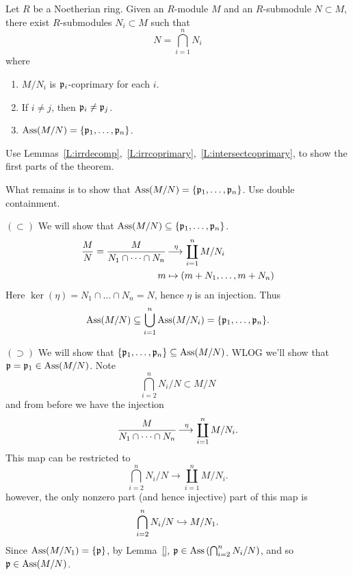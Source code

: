 \documentclass{ximera}
\begin{document}
\begin{theorem}
  Let $R$ be a Noetherian ring. Given an $R$-module $M$ and an
  $R$-submodule $N\subset M$, there exist $R$-submodules $N_i\subset
  M$ such that
  \[
  N = \bigcap_{i=1}^n N_i
  \]
  where
  \begin{enumerate}
  \item $M/N_i$ is $\mathfrak{p}_i$-coprimary for each $i$.
  \item If $i\ne j$, then $\mathfrak{p}_i\ne\mathfrak{p}_j$.
  \item $\operatorname{Ass}(M/N) = \{\mathfrak{p}_1,\dots,\mathfrak{p}_n\}$.
  \end{enumerate}
  \begin{sketch}
    Use Lemmas~\ref{L:irrdecomp},~\ref{L:irrcoprimary},~\ref{L:intersectcoprimary},
    to show the first parts of the theorem.
    
    What remains is to show that $\operatorname{Ass}(M/N) =
    \{\mathfrak{p}_1,\dots,\mathfrak{p}_n\}$. Use double containment.
    
    $(\subset)$ We will show that $\operatorname{Ass}(M/N)
    \subseteq\{\mathfrak{p}_1,\dots,\mathfrak{p}_n\}$.
    \begin{align*}
      \frac{M}{N} = \frac{M}{N_1\cap\dots\cap N_n} &\mathop{\longrightarrow\,}\limits^\eta \coprod_{i=1}^n M/N_i\\
        m &\mapsto (m + N_1,\dots, m+ N_n)
    \end{align*}
    Here $\ker(\eta) = N_1\cap\dots\cap N_n = N$, hence $\eta$ is an
    injection. Thus
    \[
    \operatorname{Ass}(M/N) \subseteq \bigcup_{i=1}^n \operatorname{Ass}(M/N_i) = \{\mathfrak{p}_1,\dots,\mathfrak{p}_n\}.
    \]


    $(\supset)$ We will show that $\{\mathfrak{p}_1,\dots,\mathfrak{p}_n\} \subseteq
    \operatorname{Ass}(M/N)$. WLOG we'll show that $\mathfrak{p}=\mathfrak{p}_1\in\operatorname{Ass}(M/N)$. Note
    \[
    \bigcap_{i=2}^n N_i/N \subset M/N
    \]
    and from before we have the injection
    \[
    \frac{M}{N_1\cap\dots\cap N_n} \mathop{\longrightarrow\,}\limits^\eta \coprod_{i=1}^n M/N_i.
    \]
    This map can be restricted to
    \[
    \bigcap_{i=2}^n N_i/N \to \coprod_{i=1}^n M/N_i.
    \]
    however, the only nonzero part (and hence injective) part of this
    map is
    \[
    \bigcap_{i=2}^n N_i/N \hookrightarrow M/N_1.
    \]
    Since $\operatorname{Ass}(M/N_1) = \{\mathfrak{p}\}$, by Lemma~\ref{},
    $\mathfrak{p}\in\operatorname{Ass}\left(\bigcap_{i=2}^n N_i/N\right)$, and so
    $\mathfrak{p}\in\operatorname{Ass}(M/N)$.
  \end{sketch}
\end{theorem}
\end{document}
